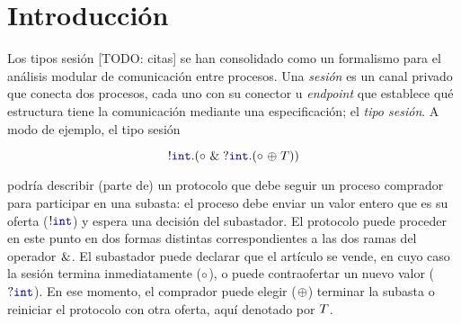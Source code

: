 \section{Introducción}

Los tipos sesión [TODO: citas] se han consolidado como un formalismo para el
análisis modular de comunicación entre procesos. Una \emph{sesión} es un canal
privado que conecta dos procesos, cada uno con su conector u \emph{endpoint} que
establece qué estructura tiene la comunicación mediante una especificación; el
\emph{tipo sesión}. A modo de ejemplo, el tipo sesión

\begin{equation}
    \label{eq:bare.auction}
    \cout \tint \parens {
        \tbranch [] \tend {
            \cin \tint \parens {
                \tchoice [] \tend \T
            }
        }
    }
\end{equation}

podría describir (parte de) un protocolo que debe seguir un proceso comprador
para participar en una subasta: el proceso debe enviar un valor entero que es su
oferta ($ \cout [] \tint $) y espera una decisión del subastador. El protocolo
puede proceder en este punto en dos formas distintas correspondientes a las dos
ramas del operador $ \tbranch [] {} {}$. El subastador puede declarar que el
artículo se vende, en cuyo caso la sesión termina inmediatamente ($ \tend $), o
puede contraofertar un nuevo valor ($ \cin [] \tint $). En ese momento, el
comprador puede elegir ($ \tchoice [] {} {} $) terminar la subasta o reiniciar
el protocolo con otra oferta, aquí denotado por $\T$.
